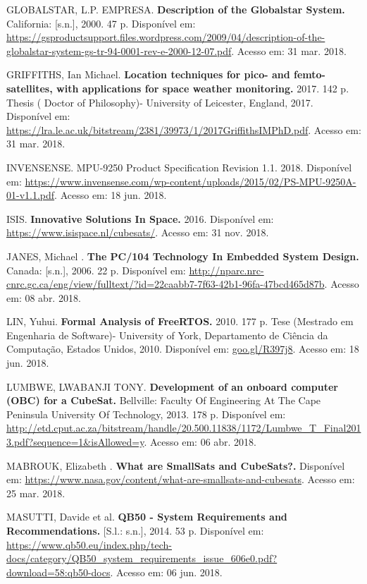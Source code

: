 \noindent GLOBALSTAR, L.P. EMPRESA. \textbf{Description of the Globalstar System. } California: [s.n.], 2000. 47 p. Disponível em: \url{https://gsproductsupport.files.wordpress.com/2009/04/description-of-the-globalstar-system-gs-tr-94-0001-rev-e-2000-12-07.pdf}. Acesso em: 31 mar. 2018.

\noindent GRIFFITHS, Ian Michael. \textbf{Location techniques for pico- and femto-satellites, with applications for space weather monitoring. } 2017. 142 p. Thesis ( Doctor of Philosophy)- University of Leicester, England, 2017. Disponível em: \url{https://lra.le.ac.uk/bitstream/2381/39973/1/2017GriffithsIMPhD.pdf}. Acesso em: 31 mar. 2018.

\noindent INVENSENSE. MPU-9250 Product Specification Revision 1.1. 2018. Disponível em: \url{https://www.invensense.com/wp-content/uploads/2015/02/PS-MPU-9250A-01-v1.1.pdf}. Acesso em: 18 jun. 2018.

\noindent ISIS. \textbf{Innovative Solutions In Space. } 2016. Disponível em: \url{https://www.isispace.nl/cubesats/}. Acesso em: 31 nov. 2018.

\noindent JANES, Michael . \textbf{The PC/104 Technology In Embedded System Design. } Canada: [s.n.], 2006. 22 p. Disponível em: \url{http://nparc.nrc-cnrc.gc.ca/eng/view/fulltext/?id=22caabb7-7f63-42b1-96fa-47bcd465d87b}. Acesso em: 08 abr. 2018.

\noindent LIN, Yuhui. \textbf{Formal Analysis of FreeRTOS.} 2010. 177 p. Tese (Mestrado em Engenharia de Software)- University of York, Departamento de Ciência da Computação, Estados Unidos, 2010. Disponível em: \url{goo.gl/R397j8}. Acesso em: 18 jun. 2018.

\noindent LUMBWE, LWABANJI TONY. \textbf{Development of an onboard computer (OBC) for a CubeSat. } Bellville: Faculty Of Engineering At The Cape Peninsula University Of Technology, 2013. 178 p. Disponível em: \url{http://etd.cput.ac.za/bitstream/handle/20.500.11838/1172/Lumbwe_T_Final2013.pdf?sequence=1&isAllowed=y}. Acesso em: 06 abr. 2018.

\noindent MABROUK, Elizabeth . \textbf{What are SmallSats and CubeSats?. } Disponível em: \url{https://www.nasa.gov/content/what-are-smallsats-and-cubesats}. Acesso em: 25 mar. 2018.

\noindent MASUTTI, Davide et al. \textbf{QB50 - System Requirements and Recommendations.} [S.l.: s.n.], 2014. 53 p. Disponível em: \url{https://www.qb50.eu/index.php/tech-docs/category/QB50_system_requirements_issue_606e0.pdf?download=58:qb50-docs}. Acesso em: 06 jun. 2018.

